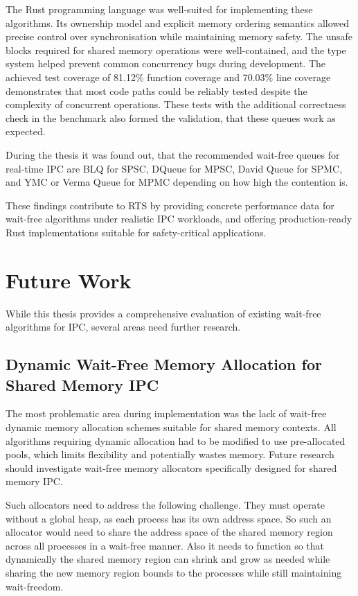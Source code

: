 The Rust programming language was well-suited for implementing these algorithms. Its ownership model and explicit memory ordering semantics allowed precise control over synchronisation while maintaining memory safety. The unsafe blocks required for shared memory operations were well-contained, and the type system helped prevent common concurrency bugs during development. The achieved test coverage of 81.12\% function coverage and 70.03\% line coverage demonstrates that most code paths could be reliably tested despite the complexity of concurrent operations. These tests with the additional correctness check in the benchmark also formed the validation, that these queues work as expected.

During the thesis it was found out, that the recommended wait-free queues for real-time \ac{IPC} are \acf{BLQ} for \ac{SPSC}, DQueue for \ac{MPSC}, David Queue for \ac{SPMC}, and \ac{YMC} or Verma Queue for \ac{MPMC} depending on how high the contention is.

These findings contribute to \ac{RTS} by providing concrete performance data for wait-free algorithms under realistic \ac{IPC} workloads, and offering production-ready Rust implementations suitable for safety-critical applications.

\section{Future Work}
While this thesis provides a comprehensive evaluation of existing wait-free algorithms for \ac{IPC}, several areas need further research.

\subsection{Dynamic Wait-Free Memory Allocation for Shared Memory \acf{IPC}}
The most problematic area during implementation was the lack of wait-free dynamic memory allocation schemes suitable for shared memory contexts. All algorithms requiring dynamic allocation had to be modified to use pre-allocated pools, which limits flexibility and potentially wastes memory. Future research should investigate wait-free memory allocators specifically designed for shared memory \ac{IPC}.

Such allocators need to address the following challenge. They must operate without a global heap, as each process has its own address space. So such an allocator would need to share the address space of the shared memory region across all processes in a wait-free manner. Also it needs to function so that dynamically the shared memory region can shrink and grow as needed while sharing the new memory region bounds to the processes while still maintaining wait-freedom.


